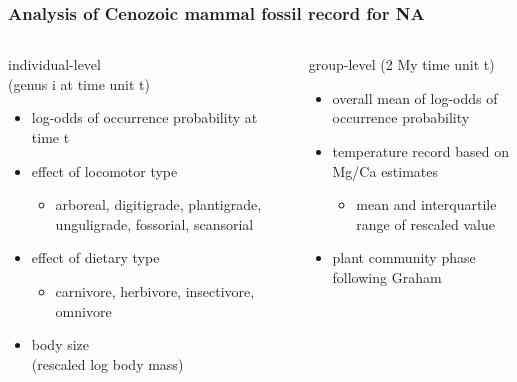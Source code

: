 \documentclass{beamer}
\begin{document}
\begin{frame}
  \frametitle{Analysis of Cenozoic mammal fossil record for NA}
  \begin{columns}
    \begin{column}{0.5\textwidth}
      individual-level \\(genus i at time unit t)
      \begin{itemize}
        \item log-odds of occurrence probability at time t
        \item effect of locomotor type
          \begin{itemize}
            \item arboreal, digitigrade, plantigrade, unguligrade, fossorial, scansorial
          \end{itemize}
        \item effect of dietary type
          \begin{itemize}
            \item carnivore, herbivore, insectivore, omnivore
          \end{itemize}
        \item body size \\(rescaled log body mass)
      \end{itemize}
    \end{column}
    \begin{column}{0.5\textwidth}
      group-level (2 My time unit t)
      \begin{itemize}
        \item overall mean of log-odds of occurrence probability
        \item temperature record based on Mg/Ca estimates
          \begin{itemize}
            \item mean and interquartile range of rescaled value
          \end{itemize}
        \item plant community phase following Graham
      \end{itemize}
    \end{column}
  \end{columns}
\end{frame}
\end{document}
